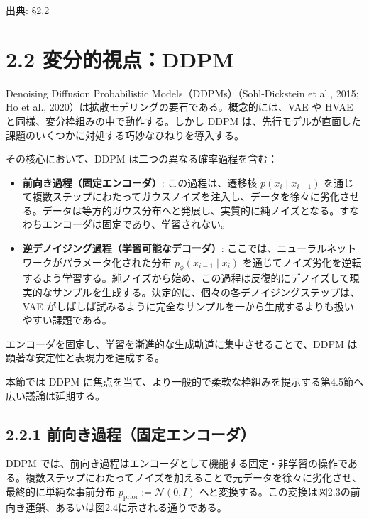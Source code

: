 

{\color{gray}\footnotesize 出典: §2.2\par}
\vspace{0.2em}

\section*{2.2 変分的視点：DDPM}


Denoising Diffusion Probabilistic Models（DDPMs）（Sohl-Dickstein et al., 2015; Ho et al., 2020）は拡散モデリングの要石である。概念的には、VAE や HVAE と同様、変分枠組みの中で動作する。しかし DDPM は、先行モデルが直面した課題のいくつかに対処する巧妙なひねりを導入する。

その核心において、DDPM は二つの異なる確率過程を含む：

\begin{itemize}
\item \textbf{前向き過程（固定エンコーダ）}: この過程は、遷移核 $p(x_i\mid x_{i-1})$ を通じて複数ステップにわたってガウスノイズを注入し、データを徐々に劣化させる。データは等方的ガウス分布へと発展し、実質的に純ノイズとなる。すなわちエンコーダは固定であり、学習されない。
\item \textbf{逆デノイジング過程（学習可能なデコーダ）}: ここでは、ニューラルネットワークがパラメータ化された分布 $p_\phi(x_{i-1}\mid x_i)$ を通じてノイズ劣化を逆転するよう学習する。純ノイズから始め、この過程は反復的にデノイズして現実的なサンプルを生成する。決定的に、個々の各デノイジングステップは、VAE がしばしば試みるように完全なサンプルを一から生成するよりも扱いやすい課題である。
\end{itemize}


エンコーダを固定し、学習を漸進的な生成軌道に集中させることで、DDPM は顕著な安定性と表現力を達成する。



本節では DDPM に焦点を当て、より一般的で柔軟な枠組みを提示する第4.5節へ広い議論は延期する。

\subsection*{2.2.1 前向き過程（固定エンコーダ）}


DDPM では、前向き過程はエンコーダとして機能する固定・非学習の操作である。複数ステップにわたってノイズを加えることで元データを徐々に劣化させ、最終的に単純な事前分布 $p_{\mathrm{prior}} := \mathcal{N}(0,I)$ へと変換する。この変換は図2.3の前向き連鎖、あるいは図2.4に示される通りである。

